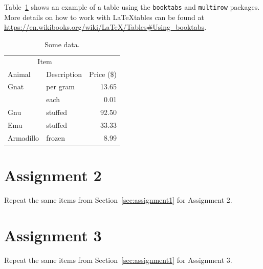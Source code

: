 \documentclass[10pt]{article}
\begin{document}
Table~\ref{tab:data} shows an example of a table using the \verb|booktabs| and \verb|multirow| packages. More details on how to work with \LaTeX tables can be found at \url{https://en.wikibooks.org/wiki/LaTeX/Tables#Using_booktabs}.
\begin{table}[!th]
\centering
\caption{Some data.}
\label{tab:data}
  \begin{tabular}{llr}
    \toprule
    \multicolumn{2}{c}{Item} &  \\
    \cmidrule(r){1-2}
    Animal    & Description  & Price (\$) \\ \midrule
    Gnat      & per gram     &      13.65 \\
              & each         &       0.01 \\
    Gnu       & stuffed      &      92.50 \\
    Emu       & stuffed      &      33.33 \\
    Armadillo & frozen       &       8.99 \\ \bottomrule
  \end{tabular}
\end{table}
\section{Assignment 2}
\label{sec:assignment2}
Repeat the same items from Section~\ref{sec:assignment1} for Assignment 2.
\section{Assignment 3}
\label{sec:assignment3}
Repeat the same items from Section~\ref{sec:assignment1} for Assignment 3.


\end{document}
